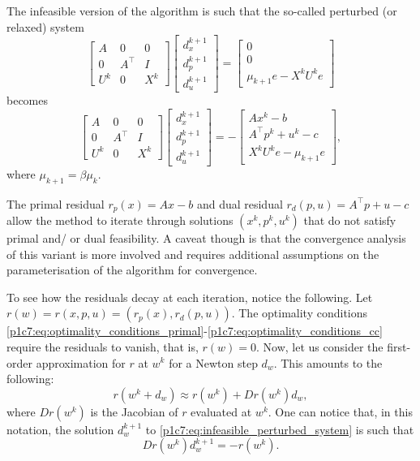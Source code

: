 The infeasible version of the algorithm is such that the so-called perturbed (or relaxed) system
	\begin{equation*} 	
		\begin{bmatrix} A  & 0 & 0 \\ 
						0  & A^\top & I \\ 
						U^k  & 0 & X^k 
		\end{bmatrix} 
		\begin{bmatrix} d_x^{k+1} \\ 
					    d_p^{k+1} \\ 
					    d_u^{k+1} 
		\end{bmatrix} =  
		\begin{bmatrix} 0 \\ 
						0 \\ 
						\mu_{k+1} e - X^k U^k e 
		\end{bmatrix} 
	\end{equation*} 
	becomes 
	\begin{equation}\label{p1c7:eq:infeasible_perturbed_system}
	\begin{bmatrix} A  & 0 & 0 \\ 
					0  & A^\top & I \\ 
					U^k & 0 & X^k 
	\end{bmatrix} 
	\begin{bmatrix}d_x^{k+1} \\ 
				   d_p^{k+1} \\ 
				   d_u^{k+1} 
	\end{bmatrix} = - 
	\begin{bmatrix} Ax^k - b \\ A^\top p^k + u^k - c \\ X^k U^ke -\mu_{k+1}e \end{bmatrix}, 
	\end{equation}
	where $\mu_{k+1} = \beta\mu_k$.

The primal residual $r_p(x) = Ax - b$ and dual residual $r_d(p,u) = A^\top p + u - c$ allow the method to iterate through solutions $(x^k, p^k, u^k)$ that do not satisfy primal and/ or dual feasibility. A caveat though is that the convergence analysis of this variant is more involved and requires additional assumptions on the parameterisation of the algorithm for convergence. 

To see how the residuals decay at each iteration, notice the following. Let $r(w) = r(x,p,u) = (r_p(x), r_d(p,u))$. The optimality conditions \eqref{p1c7:eq:optimality_conditions_primal}-\eqref{p1c7:eq:optimality_conditions_cc} require the residuals to vanish, that is, $r(w) = 0$. Now, let us consider the first-order approximation for $r$ at $w^k$ for a Newton step $d_w$. This amounts to the following:
	$$
	r(w^k + d_w) \approx r(w^k) + Dr(w^k)d_w,
	$$
	where $Dr(w^k)$ is the Jacobian of $r$ evaluated at $w^k$. One can notice that, in this notation, the solution $d_w^{k+1}$ to \eqref{p1c7:eq:infeasible_perturbed_system} is such that 
		$$
		Dr(w^k) d_w^{k+1} = -r(w^k).
		$$

